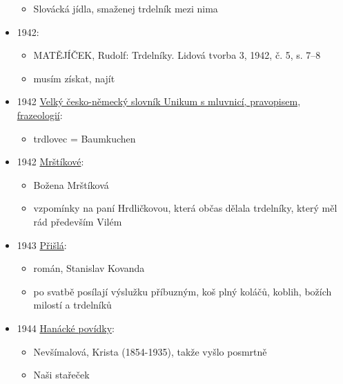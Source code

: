 \begin{itemize}
  \begin{itemize}
  \tightlist
  \item
    Slovácká jídla, smaženej trdelník mezi nima
  \end{itemize}
\item
  1942:

  \begin{itemize}
  \tightlist
  \item
    MATĚJÍČEK, Rudolf: Trdelníky. Lidová tvorba 3, 1942, č. 5, s. 7--8
  \item
    musím získat, najít
  \end{itemize}
\item
  1942
  \href{https://ceskadigitalniknihovna.cz/uuid/uuid:086b8270-e420-11e8-a5a4-005056827e52}{Velký
  česko-německý slovník Unikum s mluvnicí, pravopisem, frazeologií}:

  \begin{itemize}
  \tightlist
  \item
    trdlovec = Baumkuchen
  \end{itemize}
\item
  1942
  \href{https://ceskadigitalniknihovna.cz/uuid/uuid:2c588580-119c-11e9-a03f-5ef3fc9bb22f}{Mrštíkové}:

  \begin{itemize}
  \tightlist
  \item
    Božena Mrštíková
  \item
    vzpomínky na paní Hrdličkovou, která občas dělala trdelníky, který
    měl rád především Vilém
  \end{itemize}
\item
  1943
  \href{https://ceskadigitalniknihovna.cz/uuid/uuid:dc1db170-6fe9-11ed-a5ba-005056827e51}{Přišlá}:

  \begin{itemize}
  \tightlist
  \item
    román, Stanislav Kovanda
  \item
    po svatbě posílají výslužku příbuzným, koš plný koláčů, koblih,
    božích milostí a trdelníků
  \end{itemize}
\item
  1944
  \href{https://ceskadigitalniknihovna.cz/uuid/uuid:bca2a111-2a25-42f8-b998-2567d7c7e193}{Hanácké
  povídky}:

  \begin{itemize}
  \tightlist
  \item
    Nevšímalová, Krista (1854-1935), takže vyšlo posmrtně
  \item
    Naši stařeček


\end{itemize}
\end{itemize}
